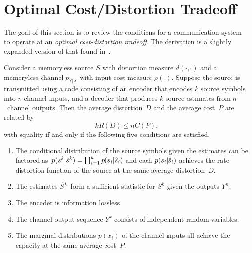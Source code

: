 \section{Optimal Cost/Distortion Tradeoff}
\label{sec:fboptimality}

The goal of this section is to review the conditions for a communication system
to operate at an \emph{optimal cost-distortion tradeoff}. The derivation is a
slightly expanded version of that found in~\cite[Section~3.5]{GastparThesis}.

\begin{theorem}
  \label{thm:feedbackconv}
  Consider a memoryless source $S$ with distortion measure $d(\cdot,\cdot)$ and
  a memoryless channel $p_{Y|X}$ with input cost measure $\rho(\cdot)$. Suppose
  the source is transmitted using a code consisting of an encoder that encodes
  $k$ source symbols into $n$ channel inputs, and a decoder that produces $k$
  source estimates from $n$~channel outputs. Then the average distortion~$D$ and
  the average cost~$P$ are related by
  \begin{equation}
    \label{eq:shannonlimit}
    kR(D) \le nC(P),
  \end{equation}
  with equality if and only if the following five conditions are satisfied.
  \begin{enumerate}
    \item The conditional distribution of the source symbols given the estimates
      can be factored as~$p(s^k|{\hat{s}}^k) = \prod_{i=1}^k p(s_i|{\hat{s}}_i)$ and each
      $p(s_i|{\hat{s}}_i)$ achieves the rate distortion function of the source at the
      same average distortion~$D$. 
    \item The estimates ${\hat{S}}^k$ form a sufficient statistic for $S^k$ given the
      outputs $Y^n$. 
    \item The encoder is information lossless.
    \item The channel output sequence $Y^k$ consists of independent random
      variables. 
    \item The marginal distributions $p(x_i)$ of the channel inputs all achieve
      the capacity at the same average cost~$P$.
  \end{enumerate}
\end{theorem}

